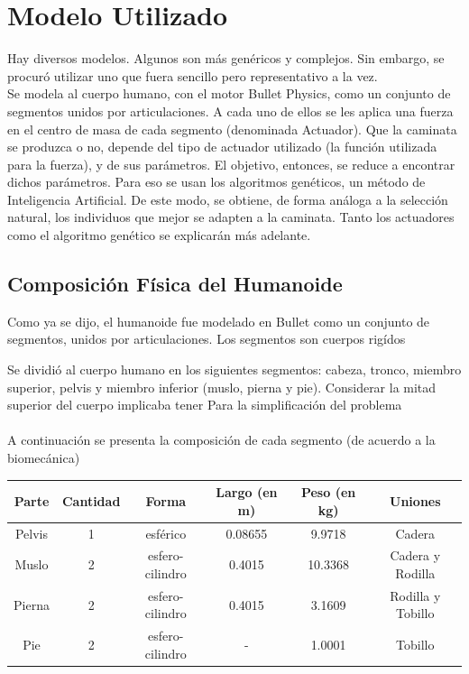 \documentclass{article}
\begin{document}




\section{Modelo Utilizado}

Hay diversos modelos. Algunos son m\'as gen\'ericos \cite{flexibleMuscle} \cite{Wojtyra} y complejos.  Sin embargo, se procur\'o utilizar uno que fuera sencillo pero representativo a la vez.\\ 
Se modela al cuerpo humano, con el motor Bullet Physics, como un conjunto de segmentos unidos por articulaciones. A cada uno de ellos se les aplica una fuerza en el centro de masa de cada segmento (denominada Actuador). Que la caminata se produzca o no, depende del tipo de actuador utilizado (la funci\'on utilizada para la fuerza), y de sus par\'ametros. El objetivo, entonces, se reduce a encontrar dichos par\'ametros. Para eso se usan los algoritmos gen\'eticos, un m\'etodo de Inteligencia Artificial. De este modo, se obtiene, de forma an\'aloga a la selecci\'on natural, los individuos que mejor se adapten a la caminata. Tanto los actuadores como el algoritmo gen\'etico se explicar\'an m\'as adelante. \\ 

\subsection{Composici\'on F\'isica del Humanoide}
Como ya se dijo, el humanoide fue modelado en Bullet como un conjunto de segmentos, unidos por articulaciones. Los segmentos son cuerpos rig\'idos 

Se dividi\'o al cuerpo humano en los siguientes segmentos: cabeza, tronco, miembro superior, pelvis y miembro inferior (muslo, pierna y pie). Considerar la mitad superior del cuerpo implicaba tener    Para la simplificaci\'on del problema \\ \\
A continuaci\'on se presenta la composici\'on de cada segmento (de acuerdo a la biomec\'anica) \\ 
\begin{center}
	\begin{tabular}{ | c | c | c | c | c | c |}
	  \hline
	  Parte & Cantidad & Forma & Largo (en m) & Peso (en kg) & Uniones\\
	  \hline 
	  \hline
	  Pelvis & 1 & esf\'erico & 0.08655 & 9.9718 & Cadera\\
	  \hline
	  Muslo & 2 & esfero-cilindro & 0.4015 & 10.3368 & Cadera y Rodilla\\
	  \hline
	  Pierna & 2 & esfero-cilindro &  0.4015 & 3.1609 & Rodilla y Tobillo\\
	  \hline
	  Pie & 2 & esfero-cilindro & - & 1.0001 & Tobillo\\
	  \hline
	\end{tabular}
\end{center}
\end{document}

